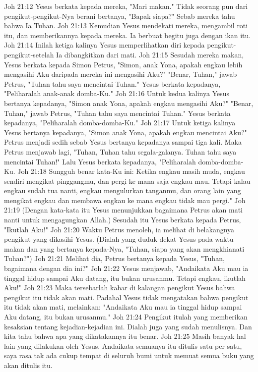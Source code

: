 Joh 21:12  Yesus berkata kepada mereka, "Mari makan." Tidak seorang pun dari pengikut-pengikut-Nya berani bertanya, "Bapak siapa?" Sebab mereka tahu bahwa Ia Tuhan.
Joh 21:13  Kemudian Yesus mendekati mereka, mengambil roti itu, dan memberikannya kepada mereka. Ia berbuat begitu juga dengan ikan itu.
Joh 21:14  Inilah ketiga kalinya Yesus memperlihatkan diri kepada pengikut-pengikut-setelah Ia dibangkitkan dari mati.
Joh 21:15  Sesudah mereka makan, Yesus berkata kepada Simon Petrus, "Simon, anak Yona, apakah engkau lebih mengasihi Aku daripada mereka ini mengasihi Aku?" "Benar, Tuhan," jawab Petrus, "Tuhan tahu saya mencintai Tuhan." Yesus berkata kepadanya, "Peliharalah anak-anak domba-Ku."
Joh 21:16  Untuk kedua kalinya Yesus bertanya kepadanya, "Simon anak Yona, apakah engkau mengasihi Aku?" "Benar, Tuhan," jawab Petrus, "Tuhan tahu saya mencintai Tuhan." Yesus berkata kepadanya, "Peliharalah domba-domba-Ku."
Joh 21:17  Untuk ketiga kalinya Yesus bertanya kepadanya, "Simon anak Yona, apakah engkau mencintai Aku?" Petrus menjadi sedih sebab Yesus bertanya kepadanya sampai tiga kali. Maka Petrus menjawab lagi, "Tuhan, Tuhan tahu segala-galanya. Tuhan tahu saya mencintai Tuhan!" Lalu Yesus berkata kepadanya, "Peliharalah domba-domba-Ku.
Joh 21:18  Sungguh benar kata-Ku ini: Ketika engkau masih muda, engkau sendiri mengikat pinggangmu, dan pergi ke mana saja engkau mau. Tetapi kalau engkau sudah tua nanti, engkau mengulurkan tanganmu, dan orang lain yang mengikat engkau dan membawa engkau ke mana engkau tidak mau pergi."
Joh 21:19  (Dengan kata-kata itu Yesus menunjukkan bagaimana Petrus akan mati nanti untuk mengagungkan Allah.) Sesudah itu Yesus berkata kepada Petrus, "Ikutlah Aku!"
Joh 21:20  Waktu Petrus menoleh, ia melihat di belakangnya pengikut yang dikasihi Yesus. (Dialah yang duduk dekat Yesus pada waktu makan dan yang bertanya kepada-Nya, "Tuhan, siapa yang akan mengkhianati Tuhan?")
Joh 21:21  Melihat dia, Petrus bertanya kepada Yesus, "Tuhan, bagaimana dengan dia ini?"
Joh 21:22  Yesus menjawab, "Andaikata Aku mau ia tinggal hidup sampai Aku datang, itu bukan urusanmu. Tetapi engkau, ikutlah Aku!"
Joh 21:23  Maka tersebarlah kabar di kalangan pengikut Yesus bahwa pengikut itu tidak akan mati. Padahal Yesus tidak mengatakan bahwa pengikut itu tidak akan mati, melainkan: "Andaikata Aku mau ia tinggal hidup sampai Aku datang, itu bukan urusanmu."
Joh 21:24  Pengikut itulah yang memberikan kesaksian tentang kejadian-kejadian ini. Dialah juga yang sudah menulisnya. Dan kita tahu bahwa apa yang dikatakannya itu benar.
Joh 21:25  Masih banyak hal lain yang dilakukan oleh Yesus. Andaikata semuanya itu ditulis satu per satu, saya rasa tak ada cukup tempat di seluruh bumi untuk memuat semua buku yang akan ditulis itu.


